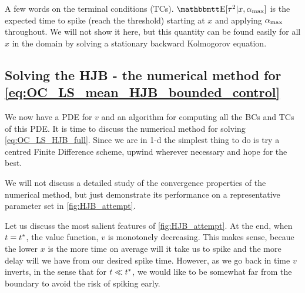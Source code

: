 \documentclass{article}
\begin{document}
A few words on the terminal conditions (TCs). $\Exp[\t^2|x, \amax]$ is the
expected time to spike (reach the threshold) starting at $x$ and applying
${ {\alpha}_{\textrm{max}} }$ throughout. We will not show it here, but this quantity can be found
easily for all $x$ in the domain by solving a stationary backward Kolmogorov
equation. 

\subsection{Solving the HJB - the numerical method for
\cref{eq:OC_LS_mean_HJB_bounded_control}}
We now have a PDE for $v$ and an algorithm for computing all the BCs and TCs of
this PDE. It is time to discuss the numerical method for solving
\cref{eq:OC_LS_HJB_full}. Since we are in 1-d the simplest thing to do is try a
centred Finite Difference scheme, upwind wherever necessary and hope for the
best.

We will not discuss a detailed study of the convergence properties of the
numerical method, but just demonstrate its performance on a representative
parameter set in \cref{fig:HJB_attempt}. 

Let us discuss the most salient features of \cref{fig:HJB_attempt}. At the end,
when $t = { t^* }$, the value function, $v$ is monotonely decreasing. This makes
sense, becaue the lower $x$ is the more time on average will it take us to spike
and the more delay will we have from our desired spike time. However, as we go
back in time $v$ inverts, in the sense that for $t \ll { t^* }$, we would like to
be somewhat far from the boundary to avoid the risk of spiking early.
\end{document}

